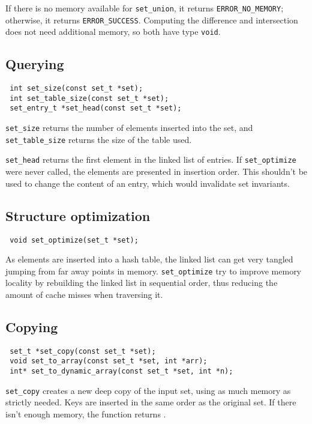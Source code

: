 If there is no memory available for \lstinline!set_union!, 
it returns \lstinline!ERROR_NO_MEMORY!; otherwise, it returns \lstinline!ERROR_SUCCESS!. Computing the difference and intersection 
does not need additional memory, so both have type \lstinline!void!.

\subsection{Querying}

\begin{lstlisting}
 int set_size(const set_t *set);
 int set_table_size(const set_t *set);
 set_entry_t *set_head(const set_t *set);
\end{lstlisting}

\lstinline!set_size! returns the number of elements inserted into the set, and \lstinline!set_table_size! returns the size of the
table used.

\lstinline!set_head! returns the first element in the linked list of entries. If \lstinline!set_optimize! were never called, the
elements are presented in insertion order. This shouldn't be used to change the content of an entry, which would invalidate set invariants.

\subsection{Structure optimization}

\begin{lstlisting}
 void set_optimize(set_t *set);
\end{lstlisting}

As elements are inserted into a hash table, the linked list can get very tangled jumping from far away points in memory. \lstinline!set_optimize!
try to improve memory locality by rebuilding the linked list in sequential order, thus reducing the amount of cache misses when traversing
it.

\subsection{Copying}

\begin{lstlisting}
 set_t *set_copy(const set_t *set);
 void set_to_array(const set_t *set, int *arr); 
 int* set_to_dynamic_array(const set_t *set, int *n);
\end{lstlisting}

\lstinline!set_copy! creates a new deep copy of the input set, using as much memory as strictly needed. Keys are inserted in the same order as the
original set. If there isn't enough memory, the function returns \NULL.

